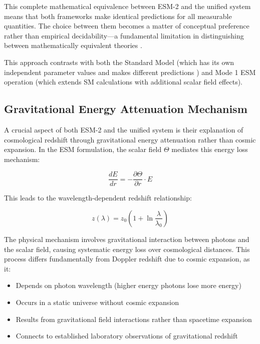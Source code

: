	This complete mathematical equivalence between ESM-2 and the unified system means that both frameworks make identical predictions for all measurable quantities. The choice between them becomes a matter of conceptual preference rather than empirical decidability—a fundamental limitation in distinguishing between mathematically equivalent theories \cite{vanFraassen1980}.
	
	This approach contrasts with both the Standard Model (which has its own independent parameter values and makes different predictions \cite{Weinberg1989}) and Mode 1 ESM operation (which extends SM calculations with additional scalar field effects).
	
	\subsection{Gravitational Energy Attenuation Mechanism}
	\label{subsec:gravitational_energy_attenuation}
	
	A crucial aspect of both ESM-2 and the unified system is their explanation of cosmological redshift through gravitational energy attenuation rather than cosmic expansion. In the ESM formulation, the scalar field $\Theta$ mediates this energy loss mechanism:
	
	\begin{equation}
		\frac{dE}{dr} = -\frac{\partial \Theta}{\partial r} \cdot E
	\end{equation}
	
	This leads to the wavelength-dependent redshift relationship:
	
	\begin{equation}
		z(\lambda) = z_0\left(1 + \ln\frac{\lambda}{\lambda_0}\right)
	\end{equation}
	
	The physical mechanism involves gravitational interaction between photons and the scalar field, causing systematic energy loss over cosmological distances. This process differs fundamentally from Doppler redshift due to cosmic expansion, as it:
	
	\begin{itemize}
		\item Depends on photon wavelength (higher energy photons lose more energy)
		\item Occurs in a static universe without cosmic expansion
		\item Results from gravitational field interactions rather than spacetime expansion
		\item Connects to established laboratory observations of gravitational redshift \cite{Pound1960,Bertotti2003}
	\end{itemize}
	
